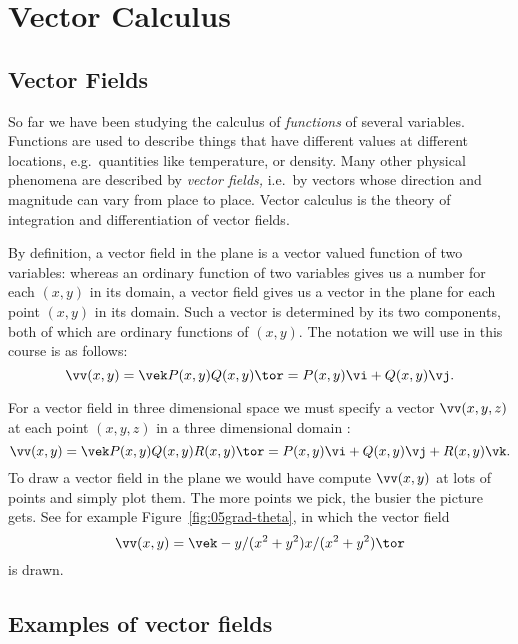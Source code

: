 \chapter{Vector Calculus}
\section{Vector Fields}
So far we have been studying the calculus of \textit{functions} of several
variables.  Functions are used to describe things that have different values at
different locations, e.g.~quantities like temperature, or density.  Many other
physical phenomena are described by \emph{vector fields,} i.e.~by vectors whose
direction and magnitude can vary from place to place.  Vector calculus is the
theory of integration and differentiation of vector fields.

By definition, a vector field in the plane is a vector valued function of two
variables: whereas
an ordinary function of two variables gives us a number for each $(x, y)$ in its
domain, a vector field gives us a vector in the plane for each point $(x,y)$ in
its domain.  Such a vector is determined by its two components, both of which
are ordinary functions of $(x, y)$.  The notation we will use in this course is
as follows:
\begin{equation}
  \vv(x, y) = \vek P(x, y) \\ Q(x, y)\tor = 
  P(x,y) \vi + Q(x, y) \vj.
  \label{eq:05vectorfield-notation}
\end{equation}

For a vector field in three dimensional space we must specify a vector $\vv(x,
y, z)$ at each point $(x, y, z)$ in a three dimensional domain :
\[
\vv(x, y) = \vek P(x, y) \\ Q(x, y) \\ R(x, y)\tor = P(x,y) \vi + Q(x, y) \vj +
R(x, y)\vk.
\]
To draw a vector field in the plane we would have compute $\vv(x, y)$ at lots of
points and simply plot them.  The more points we pick, the busier the picture
gets.  See for example Figure~\ref{fig:05grad-theta}, in which the vector field
\begin{equation}\label{eq:05grad-theta}
  \vv(x, y) = \vek -y / (x^2+y^2)\\ x/(x^2+y^2) \tor
\end{equation}
is drawn.


\section{Examples of vector fields}
\label{sec:vector-field-examples}

